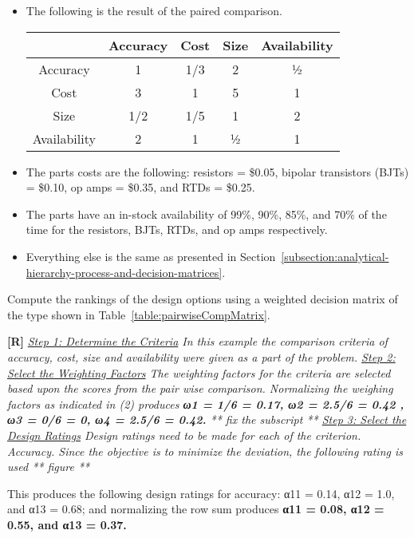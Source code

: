 \begin{enumerate}
\begin{itemize}
\item
  The following is the result of the paired comparison.

\begin{table}
\begin{tabular}{|c|c|c|c|c|}
\hline
              &
Accuracy &
Cost &
Size &
Availability \\ \hline
Accuracy & 1 & 1/3 & 2 & ½ \\ \hline
Cost & 3 & 1 & 5 & 1 \\ \hline
Size & 1/2 & 1/5 & 1 & 2 \\ \hline
Availability & 2 & 1 & ½ & 1 \\ \hline
\end{tabular}
\end{table}


\item
  The parts costs are the following: resistors = \$0.05, bipolar
  transistors (BJTs) = \$0.10, op amps = \$0.35, and RTDs = \$0.25.
\item
  The parts have an in-stock availability of 99\%, 90\%, 85\%, and 70\%
  of the time for the re­sistors, BJTs, RTDs, and op amps respectively.
\item
  Everything else is the same as presented in 
  Section~\ref{subsection:analytical-hierarchy-process-and-decision-matrices}.
\end{itemize}

Compute the rankings of the design options using a weighted decision
matrix of the type shown in Table~\ref{table:pairwiseCompMatrix}.

  \begin{onlysolution}
    \textbf{[R]}
    \itshape
    \underline{Step 1: Determine the Criteria}
    In this example the comparison criteria of accuracy, cost, size and 
    availability were given as a part of the problem.
    \underline{Step 2: Select the Weighting Factors}
    The weighting factors for the criteria are selected based upon the 
    scores from the pair wise comparison. Normalizing the weighing factors 
    as indicated in (2) produces \textbf{ω1 = 1/6 = 0.17, ω2 = 2.5/6 = 0.42
    , ω3 = 0/6 = 0, ω4 = 2.5/6 = 0.42.} ** fix the subscript **
    \underline{Step 3: Select the Design Ratings}
    Design ratings need to be made for each of the criterion.
    \textit{Accuracy.} Since the objective is to minimize the deviation, 
    the following rating is used 
      ** figure ** 
    
    This produces the following design ratings for accuracy: α11 = 0.14, α12 = 1.0, 
    and α13 = 0.68; and normalizing the row sum produces \textbf{α11 = 0.08, α12 = 0.55, 
    and α13 = 0.37.}


\end{onlysolution}
\end{enumerate}
